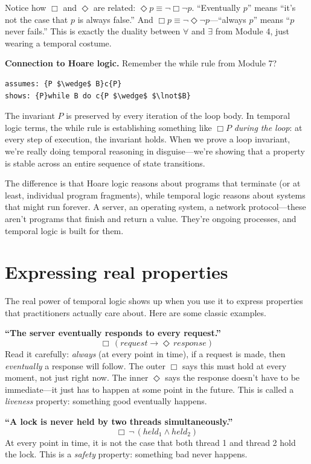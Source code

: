 \documentclass[11pt]{article}
\begin{document}
Notice how $\Box$ and $\Diamond$ are related: $\Diamond p \equiv \lnot \Box \lnot p$. ``Eventually $p$'' means ``it's not the case that $p$ is always false.'' And $\Box p \equiv \lnot \Diamond \lnot p$---``always $p$'' means ``$p$ never fails.'' This is exactly the duality between $\forall$ and $\exists$ from Module 4, just wearing a temporal costume.

\medskip
\noindent\textbf{Connection to Hoare logic.} Remember the while rule from Module 7?
\begin{lstlisting}
assumes: {P $\wedge$ B}c{P}
shows: {P}while B do c{P $\wedge$ $\lnot$B}
\end{lstlisting}
The invariant $P$ is preserved by every iteration of the loop body. In temporal logic terms, the while rule is establishing something like $\Box P$ \emph{during the loop}: at every step of execution, the invariant holds. When we prove a loop invariant, we're really doing temporal reasoning in disguise---we're showing that a property is stable across an entire sequence of state transitions.

The difference is that Hoare logic reasons about programs that terminate (or at least, individual program fragments), while temporal logic reasons about systems that might run forever. A server, an operating system, a network protocol---these aren't programs that finish and return a value. They're ongoing processes, and temporal logic is built for them.

\section{Expressing real properties}

The real power of temporal logic shows up when you use it to express properties that practitioners actually care about. Here are some classic examples.

\medskip
\noindent\textbf{``The server eventually responds to every request.''}
\[
\Box\,(\mathit{request} \to \Diamond\, \mathit{response})
\]
Read it carefully: \emph{always} (at every point in time), if a request is made, then \emph{eventually} a response will follow. The outer $\Box$ says this must hold at every moment, not just right now. The inner $\Diamond$ says the response doesn't have to be immediate---it just has to happen at some point in the future. This is called a \emph{liveness} property: something good eventually happens.

\medskip
\noindent\textbf{``A lock is never held by two threads simultaneously.''}
\[
\Box\, \lnot\, (\mathit{held}_1 \wedge \mathit{held}_2)
\]
At every point in time, it is not the case that both thread 1 and thread 2 hold the lock. This is a \emph{safety} property: something bad never happens.
\end{document}
